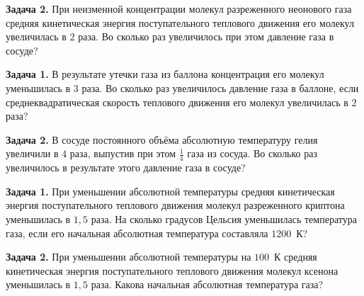\begin{taskbasic}[code={\label{task:mkt_v14_n7}}]
\textbf{Задача 2.} При неизменной концентрации молекул разреженного неонового газа средняя кинетическая энергия поступательного теплового движения его молекул увеличилась в $2$ раза. Во сколько раз увеличилось при этом давление газа в сосуде?

\end{taskbasic}


\begin{taskbasic}[code={\label{task:mkt_v19_n7}}]
\textbf{Задача 1.} В результате утечки газа из баллона концентрация его молекул уменьшилась в $3$ раза. Во сколько раз увеличилось давление газа в баллоне, если среднеквадратическая скорость теплового движения его молекул увеличилась в $2$ раза?

\end{taskbasic}

\begin{taskbasic}[code={\label{task:mkt_v20_n7}}]
\textbf{Задача 2.} В сосуде постоянного объёма абсолютную температуру гелия увеличили в $4$ раза, выпустив при этом $\frac{1}{4}$ газа из сосуда. Во сколько раз увеличилось в результате этого давление газа в сосуде?

\end{taskbasic}


\begin{taskbasic}[code={\label{task:mkt_v23_n7}}]
\textbf{Задача 1.} При уменьшении абсолютной температуры средняя кинетическая энергия поступательного теплового движения молекул разреженного криптона уменьшилась в $1{,}5$ раза. На сколько градусов Цельсия уменьшилась температура газа, если его начальная абсолютная температура составляла $1200$~К?

\end{taskbasic}

\begin{taskbasic}[code={\label{task:mkt_v24_n7}}]
\textbf{Задача 2.} При уменьшении абсолютной температуры на $100$~К средняя кинетическая энергия поступательного теплового движения молекул ксенона уменьшилась в $1{,}5$ раза. Какова начальная абсолютная температура газа?

\end{taskbasic}
